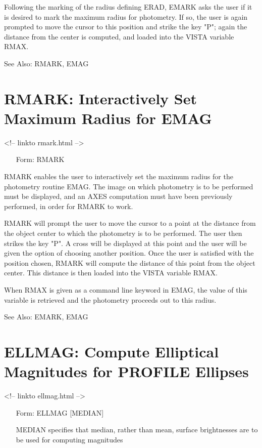 Following the marking of the radius defining ERAD, EMARK asks the user if
it is desired to mark the maximum radius for photometry. If so, the user is
again prompted to move the cursor to this position and strike the key "P";
again the distance from the center is computed, and loaded into the VISTA
variable RMAX.

See Also: RMARK, EMAG


\section{RMARK: Interactively Set Maximum Radius for EMAG}
\begin{rawhtml}
<!-- linkto rmark.html -->
\end{rawhtml}
\begin{itemize}
  \item[Form: RMARK\hfill]{}
\end{itemize}

RMARK enables the user to interactively set the maximum radius for the
photometry routine EMAG. The image on which photometry is to be performed
must be displayed, and an AXES computation must have been previously
performed, in order for RMARK to work.
 
RMARK will prompt the user to move the cursor to a point at the distance
from the object center to which the photometry is to be performed. The user
then strikes the key "P". A cross will be displayed at this point and the
user will be given the option of choosing another position. Once the user
is satisfied with the position chosen, RMARK will compute the distance of
this point from the object center. This distance is then loaded into the
VISTA variable RMAX.

When RMAX is given as a command line keyword in EMAG, the value of this
variable is retrieved and the photometry proceeds out to this radius.

See Also: EMARK, EMAG


\section{ELLMAG: Compute Elliptical Magnitudes for PROFILE Ellipses}
\begin{rawhtml}
<!-- linkto ellmag.html -->
\end{rawhtml}
\begin{itemize}
  \item[Form: ELLMAG {[MEDIAN]}\hfill]{}
  \item[MEDIAN]{specifies that median, rather than mean, surface
       brightnesses are to be used for computing magnitudes}
\end{itemize}

